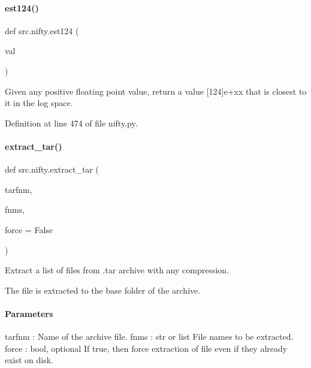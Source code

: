 \mbox{\label{namespacesrc_1_1nifty_a75b4cb8a4924d753fb3df02f13b2d9ea}} 
\paragraph{\texorpdfstring{est124()}{est124()}}
{\footnotesize\ttfamily def src.\+nifty.\+est124 (\begin{DoxyParamCaption}\item[{}]{val }\end{DoxyParamCaption})}



Given any positive floating point value, return a value \mbox{[}124\mbox{]}e+xx that is closest to it in the log space. 



Definition at line 474 of file nifty.\+py.

\mbox{\label{namespacesrc_1_1nifty_aa4ad24733c5e9b18cbc53d182575222f}} 
\paragraph{\texorpdfstring{extract\+\_\+tar()}{extract\_tar()}}
{\footnotesize\ttfamily def src.\+nifty.\+extract\+\_\+tar (\begin{DoxyParamCaption}\item[{}]{tarfnm,  }\item[{}]{fnms,  }\item[{}]{force = {\ttfamily False} }\end{DoxyParamCaption})}



Extract a list of files from .tar archive with any compression. 

The file is extracted to the base folder of the archive.

\paragraph*{Parameters }

tarfnm \+: Name of the archive file. fnms \+: str or list File names to be extracted. force \+: bool, optional If true, then force extraction of file even if they already exist on disk. 

